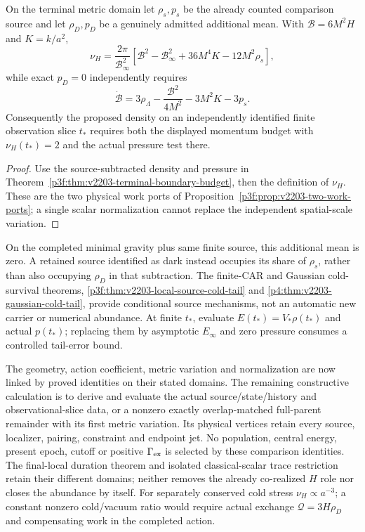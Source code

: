 \documentclass[12pt,a4paper]{article}
\begin{document}
\begin{proposition}
\label{p9:prop:v2203-abundance-two-ports}
On the terminal metric domain let \(\rho_s,p_s\) be the already counted
comparison source and let \(\rho_D,p_D\) be a genuinely admitted
additional mean. With \(\mathcal B=6M^2H\) and \(K=k/a^2\),
\[
 \nu_H=\frac{2\pi}{\mathcal B_\infty^2}
 \left[\mathcal B^2-\mathcal B_\infty^2
       +36M^4K-12M^2\rho_s\right],
\]
while exact \(p_D=0\) independently requires
\[
 \dot{\mathcal B}=3\rho_\Lambda
 -\frac{\mathcal B^2}{4M^2}-3M^2K-3p_s.
\]
Consequently the proposed density on an independently identified finite
observation slice \(t_*\) requires both the displayed momentum budget
with \(\nu_H(t_*)=2\) and the actual pressure test there.
\end{proposition}
\begin{proof}
Use the source-subtracted density and pressure in
Theorem~\ref{p3f:thm:v2203-terminal-boundary-budget}, then the definition
of \(\nu_H\). These are the two physical work ports of
Proposition~\ref{p3f:prop:v2203-two-work-ports}; a single scalar
normalization cannot replace the independent spatial-scale variation.
\end{proof}
On the completed minimal gravity plus same finite source, this additional
mean is zero. A retained source identified as dark instead occupies its
share of \(\rho_s\), rather than also occupying \(\rho_D\) in that
subtraction. The finite-CAR and Gaussian cold-survival theorems,
\ref{p3f:thm:v2203-local-source-cold-tail} and
\ref{p4:thm:v2203-gaussian-cold-tail}, provide conditional source
mechanisms, not an automatic new carrier or numerical abundance.
At finite \(t_*\), evaluate \(E(t_*)=V_*\rho(t_*)\) and actual
\(p(t_*)\); replacing them by asymptotic \(E_\infty\) and zero
pressure consumes a controlled tail-error bound.

\begin{remark}
\label{p9:rem:v2203-cold-density-frontier}
The geometry, action coefficient, metric variation and normalization
are now linked by proved identities on their stated domains. The remaining
constructive calculation is to derive and evaluate the actual source/state/history
and observational-slice data, or a nonzero exactly overlap-matched
full-parent remainder with its first metric variation. Its physical
vertices retain every source, localizer, pairing, constraint and endpoint
jet. No population, central energy, present epoch, cutoff or positive
\(\Gamma_{\rm ex}\) is selected by these comparison identities.
The final-local duration theorem and isolated classical-scalar trace
restriction retain their different domains; neither removes the already
co-realized \(H\) role nor closes the abundance by itself.
For separately conserved cold stress \(\nu_H\propto a^{-3}\);
a constant nonzero cold/vacuum ratio would require actual exchange
\(\mathcal Q=3H\rho_D\) and compensating work in the completed action.
\end{remark}
\end{document}
